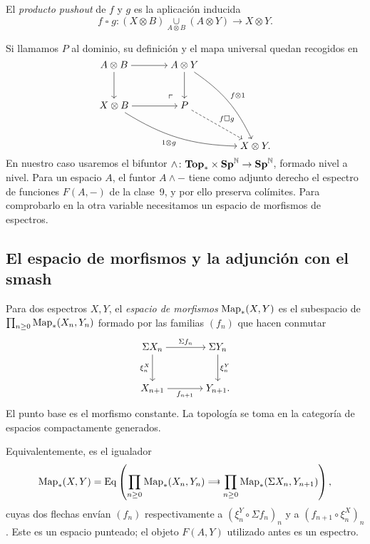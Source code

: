 \begin{defi}
El \emph{producto pushout} de $f$ y $g$ es la aplicación inducida
\[
f\mathbin{\square}g\colon
(X\otimes B)\underset{A\otimes B}{\cup}(A\otimes Y)
\longrightarrow X\otimes Y.
\]
\end{defi}
Si llamamos $P$ al dominio, su definición y el mapa universal quedan recogidos en
\[
\begin{tikzcd}[cramped,column sep=large,row sep=large]
A\otimes B \arrow[r] \arrow[d] & A\otimes Y \arrow[d] \arrow[ddr,bend left=15,"f\otimes1"] &\\
X\otimes B \arrow[r] \arrow[drr,bend right=15,"1\otimes g"']
& P \arrow[ul,phantom,"\ulcorner",very near start] \arrow[dr,dashed,"f\square g"] &\\
&& X\otimes Y.
\end{tikzcd}
\]
En nuestro caso usaremos el bifuntor $\wedge\colon\mathbf{Top}_*\times\mathbf{Sp}^{\mathbb N}\to\mathbf{Sp}^{\mathbb N}$, formado nivel a nivel. Para un espacio $A$, el funtor $A\wedge-$ tiene como adjunto derecho el espectro de funciones $F(A,-)$ de la clase~9, y por ello preserva colímites. Para comprobarlo en la otra variable necesitamos un espacio de morfismos de espectros.

\subsection{El espacio de morfismos y la adjunción con el smash}

\begin{defi}
Para dos espectros $X,Y$, el \emph{espacio de morfismos} $\operatorname{Map}_*(X,Y)$ es el subespacio de
$\prod_{n\ge0}\operatorname{Map}_*(X_n,Y_n)$ formado por las familias $(f_n)$ que hacen conmutar
\[
\begin{tikzcd}[cramped,column sep=large,row sep=large]
\Sigma X_n \arrow[r,"\Sigma f_n"] \arrow[d,"\xi^X_n"']
& \Sigma Y_n \arrow[d,"\xi^Y_n"]\\
X_{n+1} \arrow[r,"f_{n+1}"'] & Y_{n+1}.
\end{tikzcd}
\]
El punto base es el morfismo constante. La topología se toma en la categoría de espacios compactamente generados.
\end{defi}

Equivalentemente, es el igualador
\[
\operatorname{Map}_*(X,Y)=\operatorname{Eq}\left(
\prod_{n\ge0}\operatorname{Map}_*(X_n,Y_n)
\mathrel{\substack{\longrightarrow\\[-4pt]\longrightarrow}}
\prod_{n\ge0}\operatorname{Map}_*(\Sigma X_n,Y_{n+1})
\right),
\]
cuyas dos flechas envían $(f_n)$ respectivamente a $(\xi^Y_n\circ\Sigma f_n)_n$ y a $(f_{n+1}\circ\xi^X_n)_n$. Este es un espacio punteado; el objeto $F(A,Y)$ utilizado antes es un espectro.

